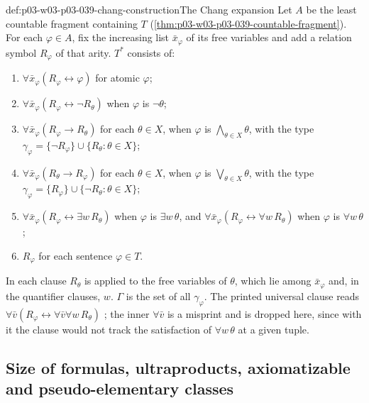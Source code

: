 \begin{hbmethod}{def:p03-w03-p03-039-chang-construction}{The Chang expansion}
Let \(A\) be the least countable fragment containing \(T\)
(\cref{thm:p03-w03-p03-039-countable-fragment}). For each \(\varphi\in A\),
fix the increasing list \(\bar x_\varphi\) of its free variables and add a
relation symbol \(R_\varphi\) of that arity. \(T^*\) consists of:
\begin{enumerate}
\item \(\forall\bar x_\varphi(R_\varphi\leftrightarrow\varphi)\) for atomic \(\varphi\);
\item \(\forall\bar x_\varphi(R_\varphi\leftrightarrow\neg R_\theta)\) when
      \(\varphi\) is \(\neg\theta\);
\item \(\forall\bar x_\varphi(R_\varphi\to R_\theta)\) for each \(\theta\in X\),
      when \(\varphi\) is \(\bigwedge_{\theta\in X}\theta\), with the type
      \(\gamma_\varphi=\{\neg R_\varphi\}\cup\{R_\theta:\theta\in X\}\);
\item \(\forall\bar x_\varphi(R_\theta\to R_\varphi)\) for each \(\theta\in X\),
      when \(\varphi\) is \(\bigvee_{\theta\in X}\theta\), with the type
      \(\gamma_\varphi=\{R_\varphi\}\cup\{\neg R_\theta:\theta\in X\}\);
\item \(\forall\bar x_\varphi(R_\varphi\leftrightarrow\exists w\,R_\theta)\) when
      \(\varphi\) is \(\exists w\,\theta\), and
      \(\forall\bar x_\varphi(R_\varphi\leftrightarrow\forall w\,R_\theta)\) when
      \(\varphi\) is \(\forall w\,\theta\);
\item \(R_\varphi\) for each sentence \(\varphi\in T\).
\end{enumerate}
In each clause \(R_\theta\) is applied to the free variables of \(\theta\),
which lie among \(\bar x_\varphi\) and, in the quantifier clauses, \(w\).
\(\Gamma\) is the set of all \(\gamma_\varphi\). The printed universal clause
reads \(\forall\bar v(R_\varphi\leftrightarrow\forall\bar v\forall w\,R_\theta)\)
\cite[p.~12]{Marker2014InfinitaryNotes}; the inner \(\forall\bar v\) is a
misprint and is dropped here, since with it the clause would not track the
satisfaction of \(\forall w\,\theta\) at a given tuple.
\end{hbmethod}

\subsection{Size of formulas, ultraproducts, axiomatizable and pseudo-elementary classes}
\label{sec:p03-w03-p03-039-expressive}

